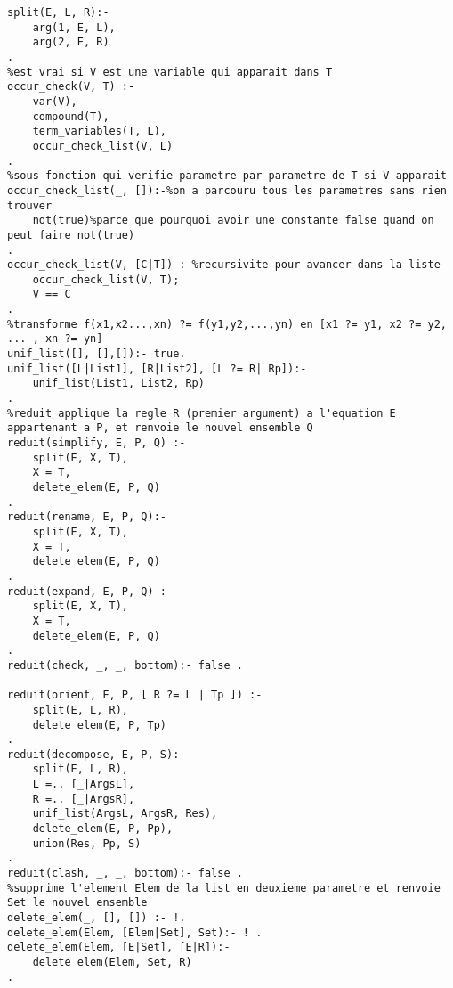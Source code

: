 \documentclass[10pt,a4paper]{report}
\begin{document}
\begin{lstlisting}[caption ={le fichier projet.pl}]
%Retourne L et R les arguments 1 et 2 de E (utilise pour couper une expression de type "X ?= Y" en deux)
split(E, L, R):-
	arg(1, E, L),
	arg(2, E, R)
.
%est vrai si V est une variable qui apparait dans T
occur_check(V, T) :-
	var(V),
	compound(T),
	term_variables(T, L),
	occur_check_list(V, L)
.
%sous fonction qui verifie parametre par parametre de T si V apparait
occur_check_list(_, []):-%on a parcouru tous les parametres sans rien trouver
	not(true)%parce que pourquoi avoir une constante false quand on peut faire not(true)
.
occur_check_list(V, [C|T]) :-%recursivite pour avancer dans la liste
	occur_check_list(V, T);
	V == C
.
%transforme f(x1,x2...,xn) ?= f(y1,y2,...,yn) en [x1 ?= y1, x2 ?= y2, ... , xn ?= yn] 
unif_list([], [],[]):- true.
unif_list([L|List1], [R|List2], [L ?= R| Rp]):-
	unif_list(List1, List2, Rp)
.
%reduit applique la regle R (premier argument) a l'equation E appartenant a P, et renvoie le nouvel ensemble Q
reduit(simplify, E, P, Q) :-
	split(E, X, T),
	X = T,
	delete_elem(E, P, Q)
.
reduit(rename, E, P, Q):-
	split(E, X, T),
	X = T,
	delete_elem(E, P, Q)
.
reduit(expand, E, P, Q) :-
	split(E, X, T),
	X = T,
	delete_elem(E, P, Q)
.
reduit(check, _, _, bottom):- false . 

reduit(orient, E, P, [ R ?= L | Tp ]) :-
	split(E, L, R),
	delete_elem(E, P, Tp)
.
reduit(decompose, E, P, S):-
	split(E, L, R),
	L =.. [_|ArgsL],
	R =.. [_|ArgsR],
	unif_list(ArgsL, ArgsR, Res),
	delete_elem(E, P, Pp),
	union(Res, Pp, S)
.
reduit(clash, _, _, bottom):- false .
%supprime l'element Elem de la list en deuxieme parametre et renvoie Set le nouvel ensemble
delete_elem(_, [], []) :- !.
delete_elem(Elem, [Elem|Set], Set):- ! .
delete_elem(Elem, [E|Set], [E|R]):-
	delete_elem(Elem, Set, R)
.
\end{lstlisting}
\end{document}
